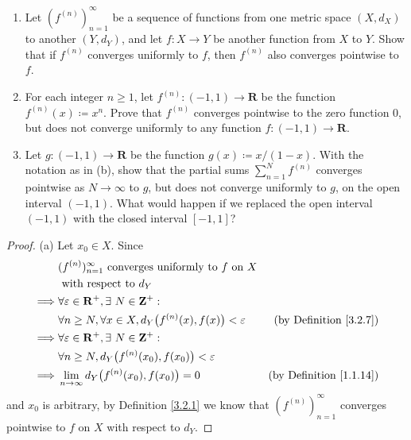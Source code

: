 \begin{exercise}\label{ex 3.2.2}
    \quad
    \begin{enumerate}
        \item Let \((f^{(n)})_{n = 1}^\infty\) be a sequence of functions from one metric space \((X, d_X)\) to another \((Y, d_Y)\), and let \(f : X \to Y\) be another function from \(X\) to \(Y\).
              Show that if \(f^{(n)}\) converges uniformly to \(f\), then \(f^{(n)}\) also converges pointwise to \(f\).
        \item For each integer \(n \geq 1\), let \(f^{(n)} : (-1, 1) \to \mathbf{R}\) be the function \(f^{(n)}(x) \coloneqq x^n\).
              Prove that \(f^{(n)}\) converges pointwise to the zero function \(0\), but does not converge uniformly to any function \(f : (-1, 1) \to \mathbf{R}\).
        \item Let \(g : (-1, 1) \to \mathbf{R}\) be the function \(g(x) \coloneqq x / (1 - x)\).
              With the notation as in (b), show that the partial sums \(\sum_{n = 1}^N f^{(n)}\) converges pointwise as \(N \to \infty\) to \(g\), but does not converge uniformly to \(g\), on the open interval \((-1, 1)\).
              What would happen if we replaced the open interval \((-1, 1)\) with the closed interval \([-1, 1]\)?
    \end{enumerate}
\end{exercise}

\begin{proof}{(a)}
    Let \(x_0 \in X\).
    Since
    \begin{align*}
                 & (f^{(n)})_{n = 1}^\infty \text{ converges uniformly to } f \text{ on } X                                             \\
                 & \text{ with respect to } d_Y                                                                                         \\
        \implies & \forall \varepsilon \in \mathbf{R}^+, \exists\ N \in \mathbf{Z}^+ :                                                  \\
                 & \forall n \geq N, \forall x \in X, d_Y\big(f^{(n)}(x), f(x)\big) < \varepsilon & \text{(by Definition \ref{3.2.7})}  \\
        \implies & \forall \varepsilon \in \mathbf{R}^+, \exists\ N \in \mathbf{Z}^+ :                                                  \\
                 & \forall n \geq N, d_Y\big(f^{(n)}(x_0), f(x_0)\big) < \varepsilon                                                    \\
        \implies & \lim_{n \to \infty} d_Y\big(f^{(n)}(x_0), f(x_0)\big) = 0                      & \text{(by Definition \ref{1.1.14})}
    \end{align*}
    and \(x_0\) is arbitrary, by Definition \ref{3.2.1} we know that \((f^{(n)})_{n = 1}^\infty\) converges pointwise to \(f\) on \(X\) with respect to \(d_Y\).
\end{proof}


